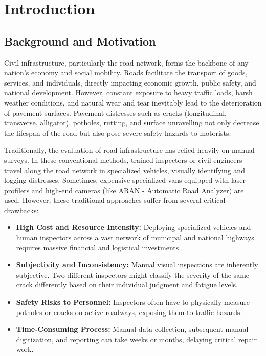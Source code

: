 \chapter{Introduction}
\label{chap:introduction}

\section{Background and Motivation}
Civil infrastructure, particularly the road network, forms the backbone of any nation's economy and social mobility. Roads facilitate the transport of goods, services, and individuals, directly impacting economic growth, public safety, and national development. However, constant exposure to heavy traffic loads, harsh weather conditions, and natural wear and tear inevitably lead to the deterioration of pavement surfaces. Pavement distresses such as cracks (longitudinal, transverse, alligator), potholes, rutting, and surface unravelling not only decrease the lifespan of the road but also pose severe safety hazards to motorists.

Traditionally, the evaluation of road infrastructure has relied heavily on manual surveys. In these conventional methods, trained inspectors or civil engineers travel along the road network in specialized vehicles, visually identifying and logging distresses. Sometimes, expensive specialized vans equipped with laser profilers and high-end cameras (like ARAN - Automatic Road Analyzer) are used. However, these traditional approaches suffer from several critical drawbacks:
\begin{itemize}
    \item \textbf{High Cost and Resource Intensity:} Deploying specialized vehicles and human inspectors across a vast network of municipal and national highways requires massive financial and logistical investments.
    \item \textbf{Subjectivity and Inconsistency:} Manual visual inspections are inherently subjective. Two different inspectors might classify the severity of the same crack differently based on their individual judgment and fatigue levels.
    \item \textbf{Safety Risks to Personnel:} Inspectors often have to physically measure potholes or cracks on active roadways, exposing them to traffic hazards.
    \item \textbf{Time-Consuming Process:} Manual data collection, subsequent manual digitization, and reporting can take weeks or months, delaying critical repair work.
\end{itemize}

